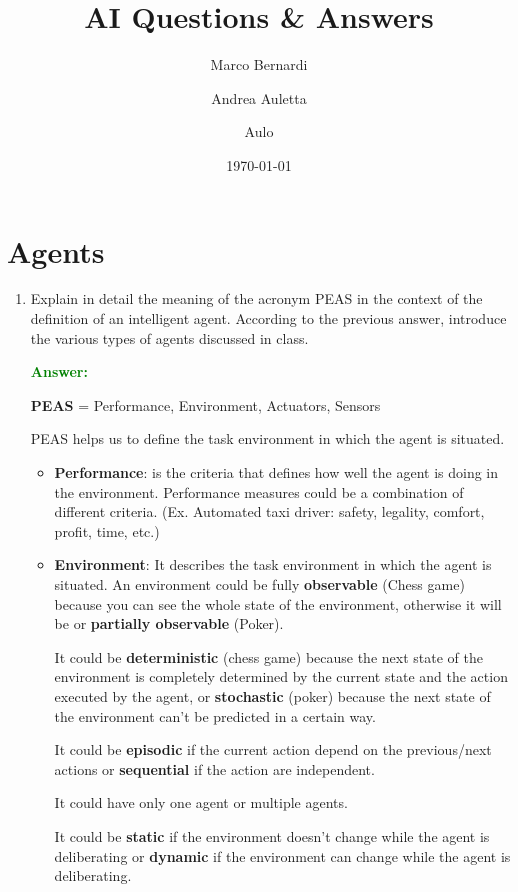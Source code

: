 \documentclass[12pt]{article}
\title{AI Questions \& Answers}
\author{
    Marco Bernardi
    \and
    Andrea Auletta
    \and
    Aulo
}
\date{\today}
\begin{document}
\maketitle
\section{Agents}
\begin{enumerate}[label=\textbf{A.\arabic*}]
    \item Explain in detail the meaning of the acronym PEAS in the context of the definition of an intelligent agent. 
    According to the previous answer, introduce the various types of agents discussed in class.
    
    \textcolor{green}{\textbf{Answer:}}
    
    \textbf{PEAS} = Performance, Environment, Actuators, Sensors

    PEAS helps us to define the task environment in which the agent is situated.
    \begin{itemize}
        \item \textbf{Performance}: is the criteria that defines how well the agent is doing in the environment.
        Performance measures could be a combination of different criteria. (Ex. Automated taxi driver: safety, legality, comfort, profit, time, etc.) 
        
        \item \textbf{Environment}: It describes the task environment in which the agent is situated.
        An environment could be fully \textbf{observable} (Chess game) because you can see the whole state of the environment, otherwise it will be 
        or \textbf{partially observable} (Poker).

        It could be \textbf{deterministic} (chess game) because the next state of the environment is completely determined 
        by the current state and the action executed by the agent,
        or \textbf{stochastic} (poker) because the next state of the environment can't be predicted in a certain way.

        It could be \textbf{episodic} if the current action depend on the previous/next actions or \textbf{sequential} if the action are independent.
        
        It could have only one agent or multiple agents.

        It could be \textbf{static} if the environment doesn't change while the agent is deliberating or \textbf{dynamic} if the environment can change while the agent is deliberating.


\end{itemize}
\end{enumerate}
\end{document}
